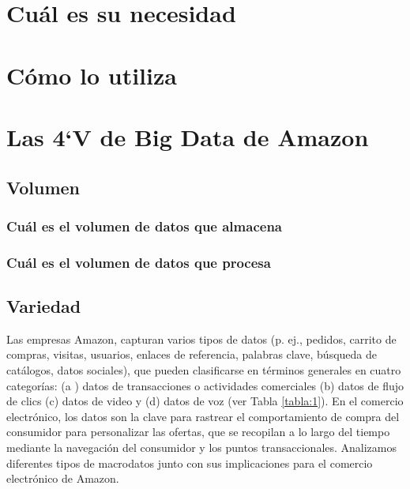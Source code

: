 \section{Cuál es su necesidad}

\lipsum[2] %


\clearpage
\section{Cómo lo utiliza}

\lipsum[2] %

\clearpage
\section{Las 4`V de Big Data de Amazon }
\subsection{Volumen}

\lipsum[1] %

\subsubsection{Cuál es el volumen de datos que almacena}
\lipsum[1] %

\subsubsection{Cuál es el volumen de datos que procesa}
\lipsum[1] %

\clearpage

\subsection{Variedad}
Las empresas Amazon, capturan varios tipos de datos (p. ej., pedidos, carrito de compras, visitas, usuarios, enlaces de referencia, palabras clave, búsqueda de catálogos, datos sociales), que pueden clasificarse en términos generales en cuatro categorías: (a ) datos de transacciones o actividades comerciales (b) datos de flujo de clics (c) datos de video y (d) datos de voz (ver Tabla \ref{tabla:1}). En el comercio electrónico, los datos son la clave para rastrear el comportamiento de compra del consumidor para personalizar las ofertas, que se recopilan a lo largo del tiempo mediante la navegación del consumidor y los puntos transaccionales. Analizamos  diferentes tipos de macrodatos junto con sus implicaciones para el comercio electrónico de Amazon.


